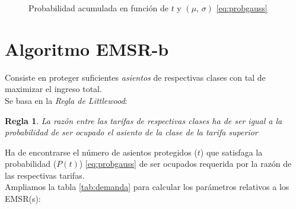 \documentclass[12pt]{article}
\newtheorem{regla}{Regla}
\begin{document}
\begin{figure}
\centering
{}
\caption{Probabilidad acumulada en función de $t$ y $(\mu , \, \sigma)$ \eqref{eq:probgauss}}\label{fig:cdf}
\end{figure}



\section{Algoritmo EMSR-b}

Consiste en proteger suficientes \emph{asientos} de respectivas clases con tal de maximizar el ingreso total.\\

Se basa en la \emph{Regla de Littlewood}:

\begin{regla}
La razón entre las tarifas de respectivas clases ha de ser igual a la probabilidad de ser ocupado el asiento de la clase de la tarifa superior
\end{regla}


Ha de encontrarse el número de asientos protegidos ($t$) que satisfaga la probabilidad ($P(t)$) \eqref{eq:probgauss} de ser ocupados requerida por la razón de las respectivas tarifas.\\

Ampliamos la tabla \ref{tab:demanda} para calcular los parámetros relativos a los EMSR(s):\\
\end{document}
